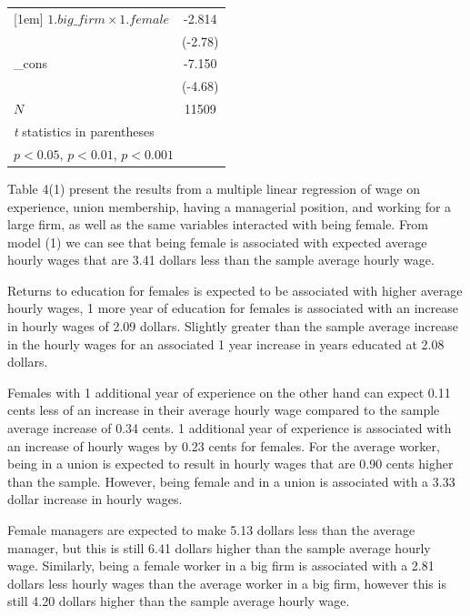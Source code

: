 \documentclass[11pt]{article}
\begin{document}
{\begin{table}[!ht]
\begin{tabular}{l*{1}{c}}
[1em]
$1.big\_firm\times 1.female$&     -2.814\sym{**} \\
            &     (-2.78)         \\
[1em]
\_cons      &      -7.150\sym{***}\\
            &     (-4.68)         \\
\hline
\(N\)       &       11509         \\
\hline\hline
\multicolumn{2}{l}{\footnotesize \textit{t} statistics in parentheses}\\
\multicolumn{2}{l}{\footnotesize \sym{*} \(p<0.05\), \sym{**} \(p<0.01\), \sym{***} \(p<0.001\)}\\
\end{tabular}
\end{table}
}

Table 4(1) present the results from a multiple linear regression of wage on experience, union membership, having a managerial position, and working for a large firm, as well as the same variables interacted with being female. From model (1) we can see that being female is associated with expected average hourly wages that are 3.41 dollars less than the sample average hourly wage. 

Returns to education for females is expected to be associated with higher average hourly wages, 1 more year of education for females is associated with an increase in hourly wages of 2.09 dollars. Slightly greater than the sample average increase in the hourly wages for an associated 1 year increase in years educated at 2.08 dollars.

Females with 1 additional year of experience on the other hand can expect 0.11 cents less of an increase in their average hourly wage compared to the sample average increase of 0.34 cents. 1 additional year of experience is associated with an increase of hourly wages by 0.23 cents for females. For the average worker, being in a union is expected to result in hourly wages that are 0.90 cents higher than the sample. However, being female and in a union is associated with a 3.33 dollar increase in hourly wages. 

Female managers are expected to make 5.13 dollars less than the average manager, but this is still 6.41 dollars higher than the sample average hourly wage. Similarly, being a female worker in a big firm is associated with a 2.81 dollars less hourly wages than the average worker in a big firm, however this is still 4.20 dollars higher than the sample average hourly wage.
\end{document}
